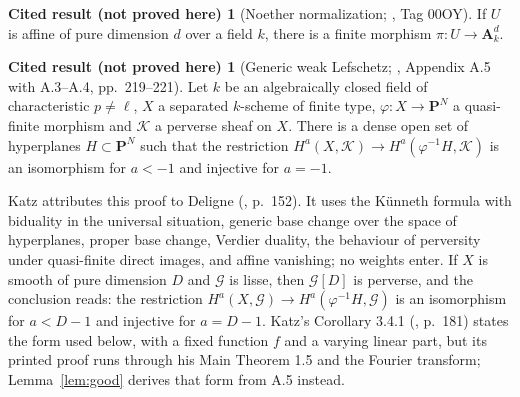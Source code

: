 \documentclass[11pt,a4paper]{article}
\theoremstyle{plain}
\theoremstyle{definition}
\newtheorem{cited}[theorem]{Cited result (not proved here)}
\theoremstyle{remark}
\newcommand{\A}{\mathbf A}
\begin{document}
\begin{cited}[Noether normalization; \cite{Stacks}, Tag 00OY]\label{cit:noether}
If $U$ is affine of pure dimension $d$ over a field $k$, there is a finite morphism $\pi:U\to\A^d_k$.
\end{cited}

\begin{cited}[Generic weak Lefschetz; \cite{KatzACT}, Appendix A.5 with A.3--A.4, pp.~219--221]\label{cit:katz}
Let $k$ be an algebraically closed field of characteristic $p\ne\ell$, $X$ a separated $k$-scheme of finite type,
$\varphi:X\to\mathbf P^N$ a quasi-finite morphism and $\mathcal K$ a perverse sheaf on $X$. There is a dense open set of
hyperplanes $H\subset\mathbf P^N$ such that the restriction $H^a(X,\mathcal K)\to H^a(\varphi^{-1}H,\mathcal K)$ is an
isomorphism for $a<-1$ and injective for $a=-1$.
\end{cited}

Katz attributes this proof to Deligne (\cite{KatzACT}, p.~152). It uses the K\"unneth formula with biduality in the
universal situation, generic base change over the space of hyperplanes, proper base change, Verdier duality, the
behaviour of perversity under quasi-finite direct images, and affine vanishing; no weights enter. If $X$ is smooth of
pure dimension $D$ and $\mathcal G$ is lisse, then $\mathcal G[D]$ is perverse, and the conclusion reads: the restriction
$H^a(X,\mathcal G)\to H^a(\varphi^{-1}H,\mathcal G)$ is an isomorphism for $a<D-1$ and injective for $a=D-1$. Katz's
Corollary 3.4.1 (\cite{KatzACT}, p.~181) states the form used below, with a fixed function $f$ and a varying linear part,
but its printed proof runs through his Main Theorem 1.5 and the Fourier transform; Lemma~\ref{lem:good} derives that form
from A.5 instead.
\end{document}
